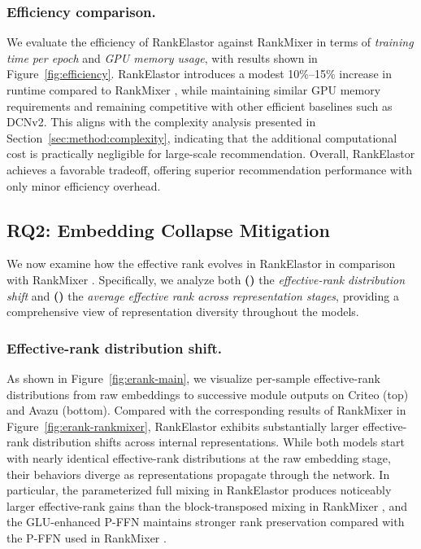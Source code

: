 \documentclass[sigconf,screen]{acmart}
\newcommand{\unimixer}{RankElastor }
\newcommand{\rankmixer}{RankMixer }
\begin{document}
\subsubsection*{\bf Efficiency comparison.} We evaluate the efficiency of \unimixer against \rankmixer in terms of \textit{training time per epoch} and \textit{GPU memory usage}, with results shown in Figure~\ref{fig:efficiency}. 
\unimixer introduces a modest 10\%–15\% increase in runtime compared to \rankmixer, while maintaining similar GPU memory requirements and remaining competitive with other efficient baselines such as DCNv2. 
This aligns with the complexity analysis presented in Section~\ref{sec:method:complexity}, indicating that the additional computational cost is practically negligible for large-scale recommendation. 
Overall, \unimixer achieves a favorable tradeoff, offering superior recommendation performance with only minor efficiency overhead.



\subsection{RQ2: Embedding Collapse Mitigation}
\label{sec:exps:exps_collapse}
We now examine how the effective rank evolves in \unimixer in comparison with \rankmixer. 
Specifically, we analyze both \textbf{()} the \textit{effective-rank distribution shift} and \textbf{()} the \textit{average effective rank across representation stages}, providing a comprehensive view of representation diversity throughout the models.

\subsubsection*{\bf Effective-rank distribution shift.} As shown in Figure~\ref{fig:erank-main}, we visualize per-sample effective-rank distributions from raw embeddings to successive module outputs on Criteo (top) and Avazu (bottom). 
Compared with the corresponding results of \rankmixer in Figure~\ref{fig:erank-rankmixer}, \unimixer exhibits substantially larger effective-rank distribution shifts across internal representations. 
While both models start with nearly identical effective-rank distributions at the raw embedding stage, their behaviors diverge as representations propagate through the network. 
In particular, the parameterized full mixing in \unimixer produces noticeably larger effective-rank gains than the block-transposed mixing in \rankmixer, and the GLU-enhanced P-FFN maintains stronger rank preservation compared with the P-FFN used in \rankmixer.
\end{document}
